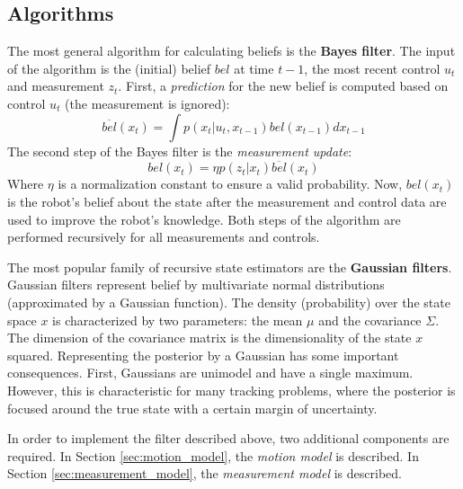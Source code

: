 \subsection{Algorithms}
\label{sec:prob-rob-bayes}
The most general algorithm for calculating beliefs is the \textbf{Bayes filter}.
The input of the algorithm is the (initial) belief $bel$ at time $t-1$, the most recent control $u_t$ and measurement $z_t$.
First, a \textit{prediction} for the new belief is computed based on control $u_t$ (the measurement is ignored):
\begin{equation}
\label{eq:background-theory-bayes-predict}
\overline{bel}(x_t) = \int p(x_t | u_t, x_{t-1}) bel(x_{t-1}) dx_{t-1}
\end{equation}
The second step of the Bayes filter is the \textit{measurement update}:
\begin{equation}
\label{eq:background-theory-bayes-measurement}
bel(x_t) = \eta p(z_t | x_t) \overline{bel}(x_t)
\end{equation}
Where $\eta$ is a normalization constant to ensure a valid probability.
Now, $bel(x_t)$ is the robot's belief about the state after the measurement and control data are used to improve the robot's knowledge.
Both steps of the algorithm are performed recursively for all measurements and controls.

The most popular family of recursive state estimators are the \textbf{Gaussian filters}.
Gaussian filters represent belief by multivariate normal distributions (approximated by a Gaussian function).
The density (probability) over the state space $x$ is characterized by two parameters: the mean $\mu$ and the covariance $\Sigma$.
The dimension of the covariance matrix is the dimensionality of the state $x$ squared.
Representing the posterior by a Gaussian has some important consequences.
First, Gaussians are unimodel and have a single maximum.
However, this is characteristic for many tracking problems, where the posterior is focused around the true state with a certain margin of uncertainty.

In order to implement the filter described above, two additional components are required.
In Section \ref{sec:motion_model}, the \textit{motion model} is described.
In Section \ref{sec:measurement_model}, the \textit{measurement model} is described.

